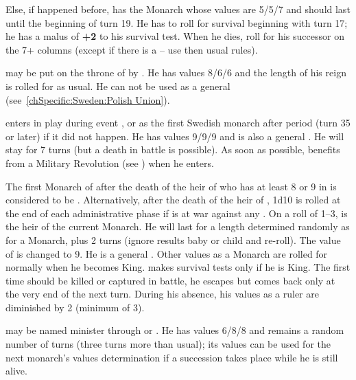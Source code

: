  Else, if 
happened before, \SUE has the Monarch  whose values
are 5/5/7 and should last until the beginning of turn 19.  He has to
roll for survival beginning with turn 17; he has a malus of {\bf +2} to
his survival test.  When he dies, roll for his successor on the 7+
columns (except if there is a  -- use then usual
rules).

 may be put on the throne of \SUE by
. He has values 8/6/6 and the length
of his reign is rolled for as usual. He can not be used as a general
(see~\ref{chSpecific:Sweden:Polish Union}).

 enters in play during event
, or as the first Swedish monarch after period
 (turn 35 or later) if it did not happen. He has values 9/9/9
and is also a general . He will stay for 7
turns (but a death in battle is possible). As soon as possible, \SUE
benefits from a Military Revolution (see
) when he enters.

\label{chSpecific:Sweden:Charles XII}
\bparag The first Monarch of \SUE after the death of the heir of
 who has at least 8 or 9 in \MIL is considered
to be .
\bparag Alternatively, after the death of the heir of , 1d10 is rolled at the end of each administrative phase if
\SUE is at war against any \MAJ. On a roll of 1--3,  is the heir of the current Monarch. He will last for a length
determined randomly as for a Monarch, plus 2 turns (ignore results baby
or child and re-roll).
\bparag The \MIL value of  is changed to 9. He is
a general . Other values as a Monarch are
rolled for normally when he becomes King.
\bparag {} makes survival tests only if he is King.
\bparag The first time  should be killed or
captured in battle, he escapes but comes back only at the very end of
the next turn. During his absence, his values as a ruler are diminished
by 2 (minimum of 3).

 may be named minister through
 or . He has values
6/8/8 and remains a random number of turns (three turns more than
usual); its values can be used for the next monarch's values
determination if a succession takes place while he is still alive.

